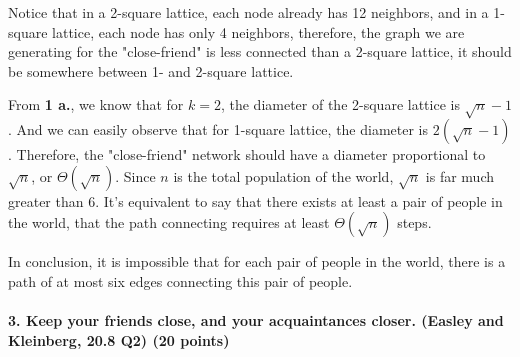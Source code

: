 \documentclass[11pt]{article} %
\begin{document}
Notice that in a 2-square lattice, each node already has 12 neighbors, and in a 1-square lattice, each node has only 4 neighbors, therefore, the graph we are generating for the "close-friend" is less connected than a 2-square lattice, it should be somewhere between 1- and 2-square lattice.

From \textbf{1 a.}, we know that for $k=2$, the diameter of the 2-square lattice is $\sqrt{n}-1$. And we can easily observe that  for 1-square lattice, the diameter is $2(\sqrt{n}-1)$. Therefore, the "close-friend" network should have a diameter proportional to $\sqrt{n}$, or $\Theta(\sqrt{n})$. Since $n$ is the total population of the world, $\sqrt{n}$ is far much greater than 6. It's equivalent to say that there exists at least a pair of people in the world, that the path connecting requires at least $\Theta(\sqrt{n})$ steps. 

In conclusion, it is impossible that for each pair of people in the world, there is a path of at most six edges connecting this pair of people.

\paragraph{3. Keep your friends close, and your acquaintances closer. (Easley and Kleinberg, 20.8 Q2) (20 points)}  
 
\end{document}
